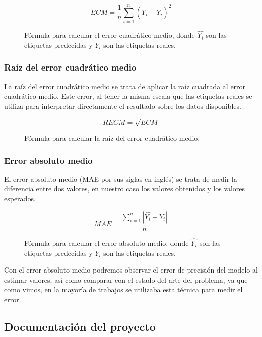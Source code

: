 \begin{figure}[H]
	 \centering
	 $$ ECM = \frac{1}{n} \sum_{i = 1}^{n}(\hat{Y_i} - Y_i)^2 $$
	 \caption{Fórmula para calcular el error cuadrático medio, donde $\hat{Y_i}$ son las etiquetas predecidas y $Y_i$ son las etiquetas reales.}
	\label{fig:ECM}
\end{figure}

\subsubsection{Raíz del error cuadrático medio}

La raíz del error cuadrático medio se trata de aplicar la raíz cuadrada al error cuadrático medio. Este error, al tener la misma escala que las etiquetas reales se utiliza para interpretar directamente el resultado sobre los datos disponibles.

\begin{figure}[H]
	 \centering
	 $$ RECM = \sqrt{ECM} $$
	 \caption{Fórmula para calcular la raíz del error cuadrático medio.}
	\label{fig:RECM}
\end{figure}

\newpage

\subsubsection{Error absoluto medio}

El error absoluto medio (MAE por sus siglas en inglés) se trata de medir la diferencia entre dos valores, en nuestro caso los valores obtenidos y los valores esperados.

\begin{figure}[H]
	 \centering
	 $$ MAE = \frac{\sum_{i = 1}^{n}|\hat{Y_i} - Y_i|}{n} $$
	 \caption{Fórmula para calcular el error absoluto medio, donde $\hat{Y_i}$ son las etiquetas predecidas y $Y_i$ son las etiquetas reales.}
	\label{fig:MAE}
\end{figure}

Con el error absoluto medio podremos observar el error de precisión del modelo al estimar valores, así como comparar con el estado del arte del problema, ya que como vimos, en la mayoría de trabajos se utilizaba esta técnica para medir el error.

\newpage

\subsection{Documentación del proyecto}

